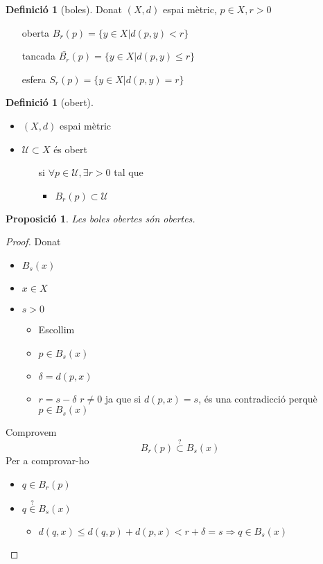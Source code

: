 \documentclass{article}
\newtheorem{proposition}[theorem]{Proposició}
\theoremstyle{definition}
\newtheorem{definition}[theorem]{Definició}
\newcommand{\U}{\mathcal{U}}
\begin{document}
\begin{definition}[boles]
Donat $(X, d)$ espai mètric, $p \in X, r > 0$
\begin{itemize}
\item[oberta] $B_r(p) = \{y \in X | d(p, y) < r\}$
\item[tancada] $\bar{B_r}(p) = \{y \in X | d(p, y) \leq r\}$
\item[esfera] $S_r(p) = \{y \in X | d(p, y) = r\}$
\end{itemize}
\end{definition}

\begin{definition}[obert]
\begin{itemize}
\item $(X, d)$ espai mètric
\item $\U \subset X$ és obert
	\begin{itemize}
	\item[si] $\forall p \in \U, \exists r > 0$ tal que
		\begin{itemize}
		\item $B_r (p) \subset \U$
		\end{itemize}
	\end{itemize}
\end{itemize}
\end{definition}

\begin{proposition}
Les boles obertes són obertes.
\end{proposition}
\begin{proof}
Donat
\begin{itemize}
\item $B_s (x)$
\item $x \in X$
\item $s > 0$
	\begin{itemize}
	\item Escollim
	\item $p \in B_s (x)$
	\item $\delta = d(p, x)$
	\item $r = s - \delta$
		\subitem $r \neq 0$ ja que si $d(p, x) = s$, és una contradicció perquè $p \in B_s(x)$
	\end{itemize}
\end{itemize}
Comprovem
$$B_r (p) \overset{?}{\subset} B_s(x)$$
Per a comprovar-ho
\begin{itemize}
\item $q \in B_r (p)$
\item $q \overset{?}{\in} B_s (x)$
	\begin{itemize}
	\item $d(q, x) \leq d(q, p) + d(p, x) < r + \delta = s \Rightarrow q \in B_s(x)$
	\end{itemize}
\end{itemize}
\end{proof}
\end{document}
